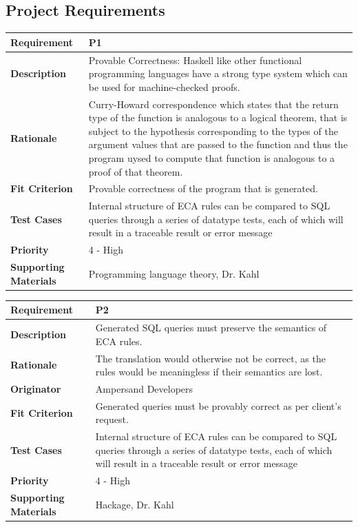 \documentclass[12pt]{report}
\begin{document}
\subsection{Project Requirements}
{\setlength{\tabcolsep}{12pt} %
    \begin{tabularx}{\textwidth}{>{\bfseries}C{3cm}X}
        Requirement & P1 \\ 
        \midrule
        \endhead
        Description  & Provable Correctness: Haskell like other functional 
        programming languages have 
        a strong type system which can be used for machine-checked proofs.
        \\	Rationale & Curry-Howard correspondence which states that the 
        return type of the function is analogous to a logical theorem, that is 
        subject to the hypothesis corresponding to the types of the argument 
        values that are passed to the function and thus the program uysed to 
        compute that function is analogous to a proof of that theorem.
        \\	Fit Criterion & Provable correctness of the program that is 
        generated.
        \\ Test Cases & Internal structure of ECA rules can be compared to SQL 
        queries through a series of datatype tests, each of which will result 
        in a traceable result or error message
        \\	Priority & 4 - High
        \\	Supporting Materials & Programming language theory, Dr. Kahl
        \vspace{12pt}
    \end{tabularx}
}
{\setlength{\tabcolsep}{12pt} %
    \begin{tabularx}{\textwidth}{>{\bfseries}C{3cm}X}
        Requirement & P2 \\ 
        \midrule
        \endhead
        Description  & Generated SQL queries must preserve the semantics of ECA 
        rules.  
        \\	Rationale & The translation would otherwise not be correct, as the 
        rules would be meaningless if their semantics are lost.
        \\	Originator & Ampersand Developers
        \\	Fit Criterion & Generated queries must be provably correct as per 
        client's request.
        \\ Test Cases & Internal structure of ECA rules can be compared to SQL 
        queries through a series of datatype tests, each of which will result 
        in a traceable result or error message
        \\	Priority & 4 - High
        \\	Supporting Materials & Hackage, Dr. Kahl
        \vspace{12pt}
    \end{tabularx}
}
\end{document}
